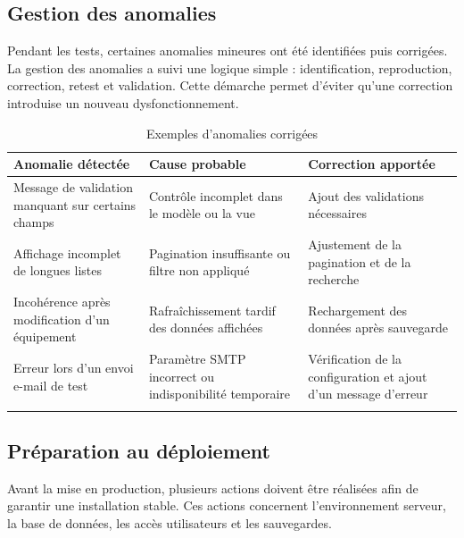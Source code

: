 \subsection{Gestion des anomalies}

Pendant les tests, certaines anomalies mineures ont été identifiées puis corrigées. La gestion des anomalies a suivi une logique simple : identification, reproduction, correction, retest et validation. Cette démarche permet d'éviter qu'une correction introduise un nouveau dysfonctionnement.

\begin{longtable}{|m{4cm}|m{5.5cm}|m{4cm}|}
\hline
\textbf{Anomalie détectée} & \textbf{Cause probable} & \textbf{Correction apportée} \\
\hline
\endhead
\endfoot
\endlastfoot
\hline
Message de validation manquant sur certains champs & Contrôle incomplet dans le modèle ou la vue & Ajout des validations nécessaires \\
\hline
Affichage incomplet de longues listes & Pagination insuffisante ou filtre non appliqué & Ajustement de la pagination et de la recherche \\
\hline
Incohérence après modification d'un équipement & Rafraîchissement tardif des données affichées & Rechargement des données après sauvegarde \\
\hline
Erreur lors d'un envoi e-mail de test & Paramètre SMTP incorrect ou indisponibilité temporaire & Vérification de la configuration et ajout d'un message d'erreur \\
\hline
\captionsetup{justification=centering,margin=1cm}
\caption{Exemples d'anomalies corrigées}
\end{longtable}

\subsection{Préparation au déploiement}

Avant la mise en production, plusieurs actions doivent être réalisées afin de garantir une installation stable. Ces actions concernent l'environnement serveur, la base de données, les accès utilisateurs et les sauvegardes.

